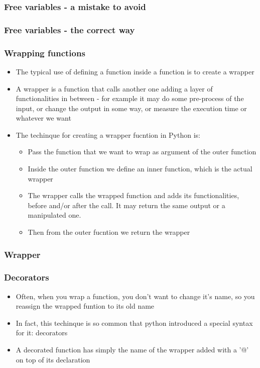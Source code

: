 \documentclass[9pt]{beamer}
\begin{document}
\begin{frame}
  \frametitle{Free variables - a mistake to avoid}
  
\end{frame}


\begin{frame}
  \frametitle{Free variables - the correct way}
  
\end{frame}


\begin{frame}
  \frametitle{Wrapping functions}
  \begin{itemize}
    \item The typical use of defining a function inside a function is to create
          a \alert{wrapper}
    \item A wrapper is a function that calls another one adding a layer
          of functionalities in between - for example it may do some pre-process
          of the input, or change the output in some way, or measure the 
          execution time or whatever we want
    \item The techinque for creating a wrapper fucntion in Python is:
    \begin{itemize}
       \item Pass the function that we want to wrap as argument of the outer
             function
       \item Inside the outer function we define an inner function, which is the
             actual wrapper
       \item The wrapper calls the wrapped function and adds its functionalities,
             before and/or after the call. It may return the same output or a 
             manipulated one.
       \item Then from the outer fucntion we return the wrapper
    \end{itemize}
  \end{itemize}
  
\end{frame}


\begin{frame}
  \frametitle{Wrapper}
  
\end{frame}


\begin{frame}
  \frametitle{Decorators}
  \begin{itemize}
    \item Often, when you wrap a function, you don't want to change
          it's name, so you reassign the wrapped funtion to its old name
    \item In fact, this techinque is so common that python introduced a special
          syntax for it: decorators
    \item A decorated function has simply the name of the wrapper added with
          a '@' on top of its declaration
  \end{itemize}
  
\end{frame}
\end{document}
